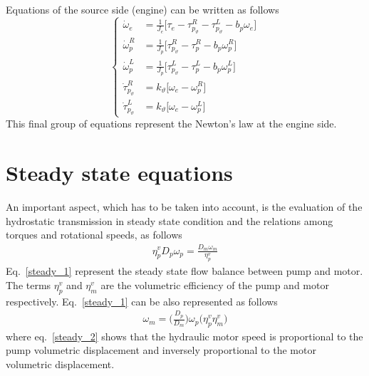 \documentclass[12pt,a4paper,oneside]{book}
\begin{document}
\begin{onehalfspace}
Equations of the source side (engine) can be written as follows
\begin{equation}\left\lbrace 
	\begin{aligned}
		\dot{\omega}_e &=\frac{1}{J_e}\Big[\tau_e -\tau_{p_\vartheta}^{R}-\tau_{p_\vartheta}^{L} - b_p\omega_e\Big] \\[8pt]
		\dot{\omega}_p^R &=\frac{1}{J_p}\Big[\tau_{p_\vartheta}^{R}-\tau_p^R - b_p\omega_p^R\Big] \\[8pt]
		\dot{\omega}_p^L &=\frac{1}{J_p}\Big[\tau_{p_\vartheta}^{L}-\tau_p^L - b_p\omega_p^L\Big] \\[8pt]
		\dot{\tau}_{p_\vartheta}^{R} &= k_\vartheta \Big[ \omega_e - \omega_p^R\Big] \\[8pt]
		\dot{\tau}_{p_\vartheta}^{L} &= k_\vartheta \Big[ \omega_e - \omega_p^L\Big]
	\end{aligned}\right. 
\end{equation}
This final group of equations represent the Newton's law at the engine side.

\section{Steady state equations}
An important aspect, which has to be taken into account, is the evaluation of the hydrostatic transmission in steady state condition and the relations among torques and rotational speeds, as follows
\begin{equation}\label{steady_1}
	\begin{aligned}
		\eta_p^vD_p\omega_p=\frac{D_m\omega_m}{\eta_p^v}
	\end{aligned}
\end{equation}
Eq.~\eqref{steady_1} represent the steady state flow balance between pump and motor. The terms $\eta_p^v$ and $\eta_m^v$ are the volumetric efficiency of the pump and motor respectively. Eq.~\eqref{steady_1} can be also represented as follows
\begin{equation}\label{steady_2}
	\boxed{	\begin{aligned}
			\omega_m=\Bigg(\frac{D_p}{D_m}\Bigg)\omega_p\Big(\eta_p^v\eta_m^v\Big)
	\end{aligned}}
\end{equation}
where eq.~\eqref{steady_2} shows that the hydraulic motor speed is proportional to the pump volumetric displacement and inversely proportional to the motor volumetric displacement.


\end{onehalfspace}
\end{document}
